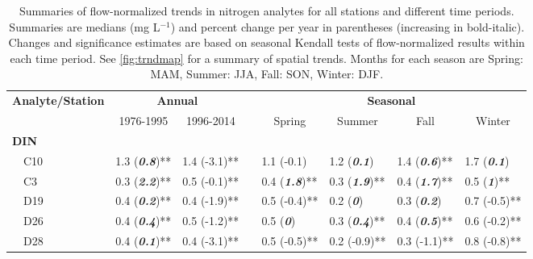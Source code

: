 \documentclass[letterpaper,12pt,oneside]{article}\usepackage[]{graphicx}\usepackage[]{color}
\begin{document}
\begin{table}[!tbp]
\caption{Summaries of flow-normalized trends in nitrogen analytes for all stations and different time periods.  Summaries are  medians (mg L$^{-1}$) and percent change per year in parentheses (increasing in bold-italic). Changes and significance estimates are based on seasonal Kendall tests of flow-normalized results within each time period. See \cref{fig:trndmap} for a summary of spatial trends. Months for each season are Spring: MAM, Summer: JJA, Fall: SON, Winter: DJF.\label{tab:trnds}} 
\begin{center}
\begin{tabular}{lllcllll}
\hline\hline
\multicolumn{1}{l}{\bfseries Analyte/Station}&\multicolumn{2}{c}{\bfseries Annual}&\multicolumn{1}{c}{\bfseries }&\multicolumn{4}{c}{\bfseries Seasonal}\tabularnewline
\cline{2-3} \cline{5-8}
\multicolumn{1}{l}{}&\multicolumn{1}{c}{1976-1995}&\multicolumn{1}{c}{1996-2014}&\multicolumn{1}{c}{}&\multicolumn{1}{c}{Spring}&\multicolumn{1}{c}{Summer}&\multicolumn{1}{c}{Fall}&\multicolumn{1}{c}{Winter}\tabularnewline
\hline
{\bfseries DIN}&&&&&&&\tabularnewline
~~C10&1.3 \footnotesize{(\textit{\textbf{0.8}})**}&1.4 \footnotesize{(-3.1)**}&&1.1 \footnotesize{(-0.1)}&1.2 \footnotesize{(\textit{\textbf{0.1}})}&1.4 \footnotesize{(\textit{\textbf{0.6}})**}&1.7 \footnotesize{(\textit{\textbf{0.1}})}\tabularnewline
~~C3&0.3 \footnotesize{(\textit{\textbf{2.2}})**}&0.5 \footnotesize{(-0.1)**}&&0.4 \footnotesize{(\textit{\textbf{1.8}})**}&0.3 \footnotesize{(\textit{\textbf{1.9}})**}&0.4 \footnotesize{(\textit{\textbf{1.7}})**}&0.5 \footnotesize{(\textit{\textbf{1}})**}\tabularnewline
~~D19&0.4 \footnotesize{(\textit{\textbf{0.2}})**}&0.4 \footnotesize{(-1.9)**}&&0.5 \footnotesize{(-0.4)**}&0.2 \footnotesize{(\textit{\textbf{0}})}&0.3 \footnotesize{(\textit{\textbf{0.2}})}&0.7 \footnotesize{(-0.5)**}\tabularnewline
~~D26&0.4 \footnotesize{(\textit{\textbf{0.4}})**}&0.5 \footnotesize{(-1.2)**}&&0.5 \footnotesize{(\textit{\textbf{0}})}&0.3 \footnotesize{(\textit{\textbf{0.4}})**}&0.4 \footnotesize{(\textit{\textbf{0.5}})**}&0.6 \footnotesize{(-0.2)**}\tabularnewline
~~D28&0.4 \footnotesize{(\textit{\textbf{0.1}})**}&0.4 \footnotesize{(-3.1)**}&&0.5 \footnotesize{(-0.5)**}&0.2 \footnotesize{(-0.9)**}&0.3 \footnotesize{(-1.1)**}&0.8 \footnotesize{(-0.8)**}\tabularnewline

\end{tabular}
\end{center}
\end{table}
\end{document}
